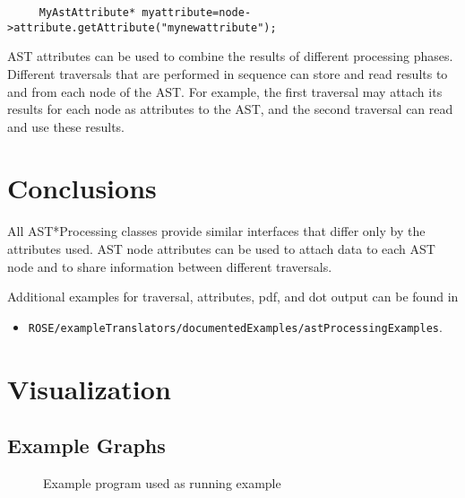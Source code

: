 {\indent
{\mySmallFontSize
\begin{verbatim}
     MyAstAttribute* myattribute=node->attribute.getAttribute("mynewattribute");
\end{verbatim}
}}
AST attributes can be used to combine the results of different
processing phases. Different traversals that are performed in
sequence can store and read results to and from each node of the
AST. For example, the first traversal may attach its results for each node as
attributes to the AST, and the second traversal can read and use these results.

\section{Conclusions}

All AST*Processing classes provide similar interfaces that differ only by the attributes used. AST node attributes can be used to attach data to each AST node and to share information between different traversals. 

Additional examples for traversal, attributes, pdf, and dot output can be found in 
\begin{itemize}
\item \verb+ROSE/exampleTranslators/documentedExamples/astProcessingExamples+.
\end{itemize}

\section{Visualization}

\subsection{Example Graphs}

\begin{figure}
\begin{latexonly}
   
\end{latexonly}

\begin{htmlonly}
   
\end{htmlonly}
\caption{Example program used as running example}
\label{AstProcessing:example1}
\end{figure}

